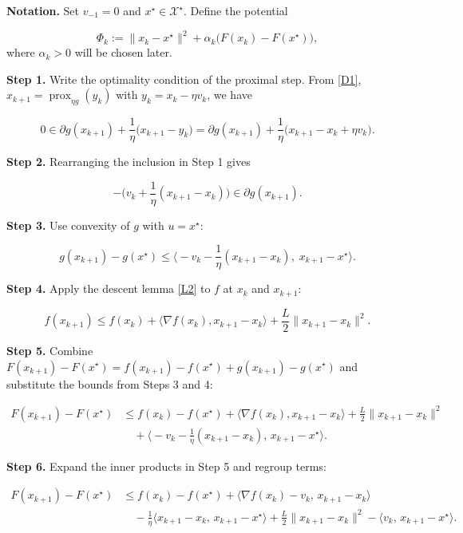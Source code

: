 \documentclass{article}
\newcommand{\prox}{\operatorname{prox}}
\newcommand{\grad}{\nabla}
\begin{document}
\medskip
\noindent\textbf{Notation.}  Set $v_{-1}=0$ and $x^{\star}\in\mathcal{X}^{\star}$.  Define the potential  

\[
\Phi_{k}:= \|x_{k}-x^{\star}\|^{2}+ \alpha_{k}\big(F(x_{k})-F(x^{\star})\big),
\tag{P1}
\]
where $\alpha_{k}>0$ will be chosen later.

\medskip
\noindent\textbf{Step 1.}  Write the optimality condition of the proximal step.  
From \eqref{D1}, $x_{k+1}= \prox_{\eta g}(y_{k})$ with $y_{k}=x_{k}-\eta v_{k}$, we have  

\[
0\in \partial g(x_{k+1})+\frac{1}{\eta}\big(x_{k+1}-y_{k}\big)
   =\partial g(x_{k+1})+ \frac{1}{\eta}\big(x_{k+1}-x_{k}+\eta v_{k}\big).
\tag{Step 1}
\]

\medskip
\noindent\textbf{Step 2.}  Rearranging the inclusion in Step 1 gives  

\[
-\big(v_{k}+ \frac{1}{\eta}(x_{k+1}-x_{k})\big)\in\partial g(x_{k+1}).
\tag{Step 2}
\]

\medskip
\noindent\textbf{Step 3.}  Use convexity of $g$ with $u=x^{\star}$:

\[
g(x_{k+1})-g(x^{\star})\le
\Big\langle -v_{k}-\frac{1}{\eta}(x_{k+1}-x_{k}),\; x_{k+1}-x^{\star}\Big\rangle .
\tag{Step 3}
\]

\medskip
\noindent\textbf{Step 4.}  Apply the descent lemma \eqref{L2} to $f$ at $x_{k}$ and $x_{k+1}$:

\[
f(x_{k+1})\le f(x_{k})+\langle\grad f(x_{k}),x_{k+1}-x_{k}\rangle
            +\frac{L}{2}\|x_{k+1}-x_{k}\|^{2}.
\tag{Step 4}
\]

\medskip
\noindent\textbf{Step 5.}  Combine $F(x_{k+1})-F(x^{\star})=f(x_{k+1})-f(x^{\star})+g(x_{k+1})-g(x^{\star})$ and substitute the bounds from Steps 3 and 4:

\[
\begin{aligned}
F(x_{k+1})-F(x^{\star})
&\le f(x_{k})-f(x^{\star})
   +\langle\grad f(x_{k}),x_{k+1}-x_{k}\rangle
   +\frac{L}{2}\|x_{k+1}-x_{k}\|^{2} \\[1mm]
&\quad +\Big\langle -v_{k}-\frac{1}{\eta}(x_{k+1}-x_{k}),\,x_{k+1}-x^{\star}\Big\rangle .
\end{aligned}
\tag{Step 5}
\]

\medskip
\noindent\textbf{Step 6.}  Expand the inner products in Step 5 and regroup terms:

\[
\begin{aligned}
F(x_{k+1})-F(x^{\star})
&\le f(x_{k})-f(x^{\star})
   +\langle\grad f(x_{k})-v_{k},\,x_{k+1}-x_{k}\rangle \\
&\quad -\frac{1}{\eta}\langle x_{k+1}-x_{k},\,x_{k+1}-x^{\star}\rangle
   +\frac{L}{2}\|x_{k+1}-x_{k}\|^{2}
   -\langle v_{k},\,x_{k+1}-x^{\star}\rangle .
\end{aligned}
\tag{Step 6}
\]
\end{document}
